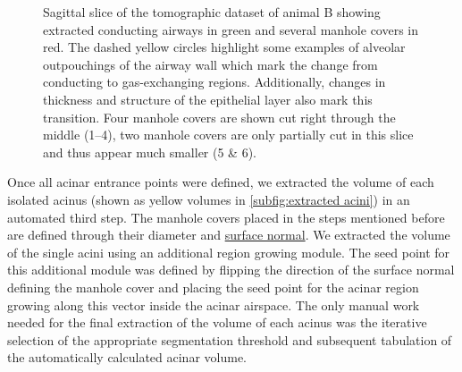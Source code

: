 \documentclass[a4paper,DIVcalc,abstract,english]{scrartcl}
\newlength\imagescale		%
\begin{document}
\begin{figure}[p]
%
	\caption{Sagittal slice of the tomographic dataset of animal B showing extracted conducting airways in green and several manhole covers in red.
		The dashed yellow circles highlight some examples of alveolar outpouchings of the airway wall which mark the change from conducting to gas-exchanging regions.
		Additionally, changes in thickness and structure of the epithelial layer also mark this transition.
		Four manhole covers are shown cut right through the middle (\numrange{1}{4}), two manhole covers are only partially cut in this slice and thus appear much smaller (5 \& 6).}
	\label{fig:ManholeCoverExplanation}
\end{figure}

Once all acinar entrance points were defined, we extracted the volume of each isolated acinus (shown as yellow volumes in \autoref{subfig:extracted acini}) in an automated third step.
The manhole covers placed in the steps mentioned before are defined through their diameter and \href{https://secure.wikimedia.org/wikipedia/en/w/index.php?title=Surface_normal&oldid=411684319}{surface normal}.
We extracted the volume of the single acini using an additional region growing module.
The seed point for this additional module was defined by flipping the direction of the surface normal defining the manhole cover and placing the seed point for the acinar region growing along this vector inside the acinar airspace.
The only manual work needed for the final extraction of the volume of each acinus was the iterative selection of the appropriate segmentation threshold and subsequent tabulation of the automatically calculated acinar volume.
\end{document}
